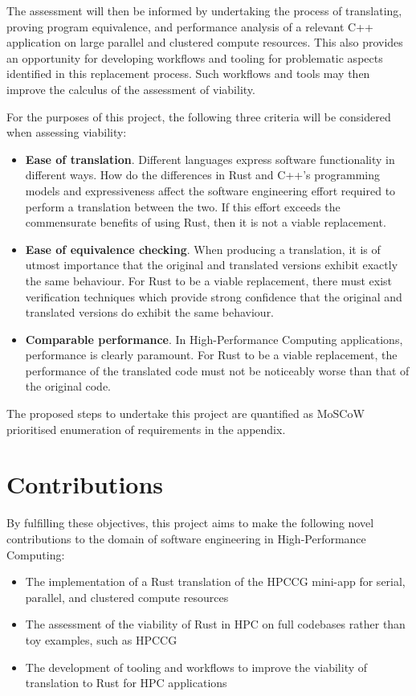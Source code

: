 The assessment will then be informed by undertaking the process of translating, proving program equivalence, and performance analysis of a relevant C++ application on large parallel and clustered compute resources. This also provides an opportunity for developing workflows and tooling for problematic aspects identified in this replacement process. Such workflows and tools may then improve the calculus of the assessment of viability.

For the purposes of this project, the following three criteria will be considered when assessing viability:

\begin{itemize}
    \item \textbf{Ease of translation}. Different languages express software functionality in different ways. How do the differences in Rust and C++'s programming models and expressiveness affect the software engineering effort required to perform a translation between the two. If this effort exceeds the commensurate benefits of using Rust, then it is not a viable replacement.
    \item \textbf{Ease of equivalence checking}. When producing a translation, it is of utmost importance that the original and translated versions exhibit exactly the same behaviour. For Rust to be a viable replacement, there must exist verification techniques which provide strong confidence that the original and translated versions do exhibit the same behaviour.
    \item \textbf{Comparable performance}. In High-Performance Computing applications, performance is clearly paramount. For Rust to be a viable replacement, the performance of the translated code must not be noticeably worse than that of the original code.
\end{itemize}

The proposed steps to undertake this project are quantified as MoSCoW prioritised \cite{CaseMethodFastTrack} enumeration of requirements in the appendix. %

\section{Contributions}
\label{sec:contributions}

By fulfilling these objectives, this project aims to make the following novel contributions to the domain of software engineering in High-Performance Computing:

\begin{itemize}
    \item The implementation of a Rust translation of the HPCCG mini-app for serial, parallel, and clustered compute resources
    \item The assessment of the viability of Rust in HPC on full codebases rather than toy examples, such as HPCCG
    \item The development of tooling and workflows to improve the viability of translation to Rust for HPC applications
\end{itemize}
